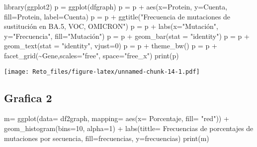 \documentclass[
]{article}
\newenvironment{Shaded}{\begin{snugshade}}{\end{snugshade}}
\newcommand{\AttributeTok}[1]{\textcolor[rgb]{0.77,0.63,0.00}{#1}}
\newcommand{\DecValTok}[1]{\textcolor[rgb]{0.00,0.00,0.81}{#1}}
\newcommand{\FunctionTok}[1]{\textcolor[rgb]{0.00,0.00,0.00}{#1}}
\newcommand{\NormalTok}[1]{#1}
\newcommand{\OtherTok}[1]{\textcolor[rgb]{0.56,0.35,0.01}{#1}}
\newcommand{\SpecialCharTok}[1]{\textcolor[rgb]{0.00,0.00,0.00}{#1}}
\newcommand{\StringTok}[1]{\textcolor[rgb]{0.31,0.60,0.02}{#1}}
\begin{document}
\begin{Shaded}
\begin{Highlighting}[]
\FunctionTok{library}\NormalTok{(ggplot2)}
\NormalTok{p }\OtherTok{=} \FunctionTok{ggplot}\NormalTok{(dfgraph)}
\NormalTok{p }\OtherTok{=}\NormalTok{ p }\SpecialCharTok{+} \FunctionTok{aes}\NormalTok{(}\AttributeTok{x=}\NormalTok{Protein, }\AttributeTok{y=}\NormalTok{Cuenta, }\AttributeTok{fill=}\NormalTok{Protein, }\AttributeTok{label=}\NormalTok{Cuenta)}
\NormalTok{p }\OtherTok{=}\NormalTok{ p }\SpecialCharTok{+} \FunctionTok{ggtitle}\NormalTok{(}\StringTok{"Frecuencia de mutaciones de sustitución en BA.5, VOC, OMICRON"}\NormalTok{)}
\NormalTok{p }\OtherTok{=}\NormalTok{ p }\SpecialCharTok{+} \FunctionTok{labs}\NormalTok{(}\AttributeTok{x=}\StringTok{"Mutación"}\NormalTok{, }\AttributeTok{y=}\StringTok{"Frecuencia"}\NormalTok{, }\AttributeTok{fill=}\StringTok{"Mutación"}\NormalTok{)}
\NormalTok{p }\OtherTok{=}\NormalTok{ p }\SpecialCharTok{+} \FunctionTok{geom\_bar}\NormalTok{(}\AttributeTok{stat =} \StringTok{"identity"}\NormalTok{)}
\NormalTok{p }\OtherTok{=}\NormalTok{ p }\SpecialCharTok{+} \FunctionTok{geom\_text}\NormalTok{(}\AttributeTok{stat =} \StringTok{"identity"}\NormalTok{, }\AttributeTok{vjust=}\DecValTok{0}\NormalTok{)}
\NormalTok{p }\OtherTok{=}\NormalTok{ p }\SpecialCharTok{+} \FunctionTok{theme\_bw}\NormalTok{()}
\NormalTok{p }\OtherTok{=}\NormalTok{ p }\SpecialCharTok{+} \FunctionTok{facet\_grid}\NormalTok{(}\SpecialCharTok{\textasciitilde{}}\NormalTok{Gene,}\AttributeTok{scales=}\StringTok{"free"}\NormalTok{, }\AttributeTok{space=}\StringTok{"free\_x"}\NormalTok{)}
\FunctionTok{print}\NormalTok{(p)}
\end{Highlighting}
\end{Shaded}

\texttt{[image: Reto\_files/figure-latex/unnamed-chunk-14-1.pdf]}

\hypertarget{grafica-2-1}{%
\subsection{Grafica 2}\label{grafica-2-1}}

\begin{Shaded}
\begin{Highlighting}[]
\NormalTok{m}\OtherTok{=} \FunctionTok{ggplot}\NormalTok{(}\AttributeTok{data=}\NormalTok{ df2graph,}
       \AttributeTok{mapping=} \FunctionTok{aes}\NormalTok{(}\AttributeTok{x=}\NormalTok{ Porcentaje, }\AttributeTok{fill=} \StringTok{"red"}\NormalTok{)) }\SpecialCharTok{+}
         \FunctionTok{geom\_histogram}\NormalTok{(}\AttributeTok{bins=}\DecValTok{10}\NormalTok{, }\AttributeTok{alpha=}\DecValTok{1}\NormalTok{) }\SpecialCharTok{+}
        \FunctionTok{labs}\NormalTok{(}\AttributeTok{tittle=} \StringTok{\textquotesingle{}Frecuencias de porcentajes de mutaciones por secuencia\textquotesingle{}}\NormalTok{,}
             \AttributeTok{fill=}\StringTok{\textquotesingle{}frecuencias\textquotesingle{}}\NormalTok{,}
             \AttributeTok{y=}\StringTok{\textquotesingle{}frecuencias\textquotesingle{}}\NormalTok{)}
\FunctionTok{print}\NormalTok{(m)}
\end{Highlighting}
\end{Shaded}
\end{document}
